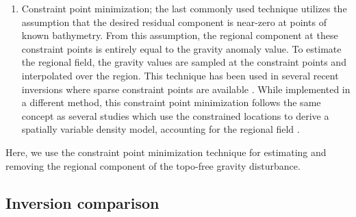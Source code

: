 \begin{enumerate}
    \item Constraint point minimization; the last commonly used technique utilizes the assumption that the desired residual component is near-zero at points of known bathymetry. From this assumption, the regional component at these constraint points is entirely equal to the gravity anomaly value. To estimate the regional field, the gravity values are sampled at the constraint points and interpolated over the region. This technique has been used in several recent inversions where sparse constraint points are available \citep{millanconstraining2020, yangbathymetry2021, yangocean2020, anbathymetry2019, anbathymetry2019a, jordannew2020, vaňkováhigh2023}. While implemented in a different method, this constraint point minimization follows the same concept as several studies which use the constrained locations to derive a spatially variable density model, accounting for the regional field \citep{tintoross2019, eisermannbathymetric2021, weigetz2020}.
\end{enumerate}

Here, we use the constraint point minimization technique for estimating and removing the regional component of the topo-free gravity disturbance.

\subsection{Inversion comparison}

